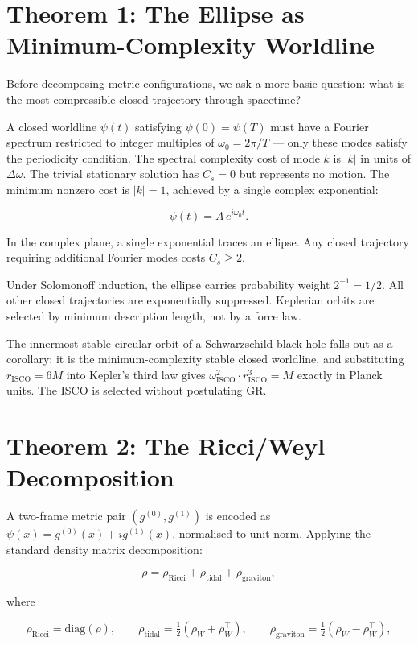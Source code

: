 \section{Theorem 1: The Ellipse as Minimum-Complexity Worldline}

Before decomposing metric configurations, we ask a more basic question:
what is the most compressible closed trajectory through spacetime?

A closed worldline $\psi(t)$ satisfying $\psi(0) = \psi(T)$ must
have a Fourier spectrum restricted to integer multiples of
$\omega_0 = 2\pi/T$ --- only these modes satisfy the periodicity
condition. The spectral complexity cost of mode $k$ is $|k|$ in units
of $\Delta\omega$. The trivial stationary solution has $C_s = 0$ but
represents no motion. The minimum nonzero cost is $|k| = 1$, achieved
by a single complex exponential:

\[
\psi(t) = A\,e^{i\omega_0 t}.
\]

In the complex plane, a single exponential traces an ellipse. Any
closed trajectory requiring additional Fourier modes costs $C_s \geq 2$.

Under Solomonoff induction, the ellipse carries probability weight
$2^{-1} = 1/2$. All other closed trajectories are exponentially
suppressed. Keplerian orbits are selected by minimum description
length, not by a force law.

The innermost stable circular orbit of a Schwarzschild black hole
falls out as a corollary: it is the minimum-complexity stable closed
worldline, and substituting $r_{\mathrm{ISCO}} = 6M$ into Kepler's
third law gives $\omega^2_{\mathrm{ISCO}} \cdot r^3_{\mathrm{ISCO}} = M$
exactly in Planck units. The ISCO is selected without postulating GR.

\section{Theorem 2: The Ricci/Weyl Decomposition}

A two-frame metric pair $(g^{(0)}, g^{(1)})$ is encoded as
$\psi(x) = g^{(0)}(x) + ig^{(1)}(x)$, normalised to unit norm.
Applying the standard density matrix decomposition:

\[
\rho = \rho_{\mathrm{Ricci}} + \rho_{\mathrm{tidal}} +
\rho_{\mathrm{graviton}},
\]

where

\[
\rho_{\mathrm{Ricci}} = \mathrm{diag}(\rho), \qquad
\rho_{\mathrm{tidal}} = \tfrac{1}{2}(\rho_W + \rho_W^\top), \qquad
\rho_{\mathrm{graviton}} = \tfrac{1}{2}(\rho_W - \rho_W^\top),
\]

